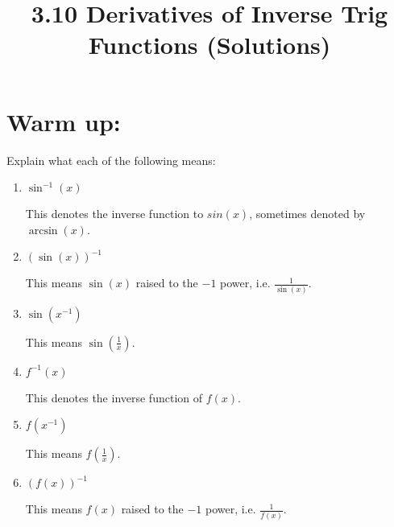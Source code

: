 \documentclass[nooutcomes]{ximera}
\title{3.10 Derivatives of Inverse Trig Functions (Solutions)}
\begin{document}
\begin{abstract}		\end{abstract}
\maketitle

\section{Warm up:} 
Explain what each of the following means:
	\begin{enumerate}
	
	\item  $\sin^{-1}(x)$
		\begin{freeResponse}
		This denotes the inverse function to $sin(x)$, sometimes denoted by $\arcsin(x)$.  
		\end{freeResponse}	
		
	\item  $\left( \sin(x) \right)^{-1}$
		\begin{freeResponse}
		This means $\sin(x)$ raised to the $-1$ power, i.e. $\frac{1}{\sin(x)}$.  
		\end{freeResponse}	
		
	\item  $\sin \left(x^{-1} \right)$
		\begin{freeResponse}
		This means $\sin \left( \frac{1}{x} \right)$.
		\end{freeResponse}	
		
	\item  $f^{-1}(x)$
		\begin{freeResponse}
		This denotes the inverse function of $f(x)$.  
		\end{freeResponse}	
		
	\item  $f(x^{-1})$
		\begin{freeResponse}
		This means $f \left( \frac{1}{x} \right)$.
		\end{freeResponse}	
		
	\item  $\left( f(x) \right)^{-1}$
		\begin{freeResponse}
		This means $f(x)$ raised to the $-1$ power, i.e. $\frac{1}{f(x)}$.  
		\end{freeResponse}	
	
	
		
	\end{enumerate}
		
\end{document}
